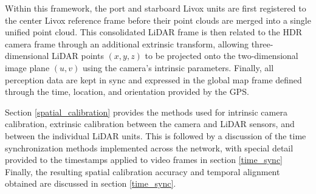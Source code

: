 \documentclass{erauthesis}
\begin{document}
Within this framework, the port and starboard Livox units are first registered to the center Livox reference frame before their point clouds are merged into a single unified point cloud.  
This consolidated LiDAR frame is then related to the HDR camera frame through an additional extrinsic transform, allowing three-dimensional LiDAR points $(x, y, z)$ to be projected onto the two-dimensional image plane $(u, v)$ using the camera’s intrinsic parameters.  
Finally, all perception data are kept in sync and expressed in the global map frame defined through the time, location, and orientation provided by the \ac{GPS}.

Section \ref{spatial_calibration} provides the methods used for intrinsic camera calibration, extrinsic calibration between the camera and LiDAR sensors, and between the individual LiDAR units. 
This is followed by a discussion of the time synchronization methods implemented across the network, with special detail provided to the timestamps applied to video frames in section \ref{time_sync}
Finally, the resulting spatial calibration accuracy and temporal alignment obtained are discussed in section \ref{time_sync}.



\end{document}
